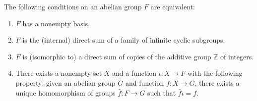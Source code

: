 The following conditions on an abelian group $F$ are equivalent:
\begin{enumerate}
\item[(i)] $F$ has a nonempty basis.
\item[(ii)] $F$ is the (internal) direct sum of a family of infinite cyclic subgroups.
\item[(iii)] $F$ is (isomorphic to) a direct sum of copies of the additive group $\mathbb{Z}$ of integers.
\item[(iv)] There exists a nonempty set $X$ and a function $\iota: X \to F$ with the following property: given an abelian group $G$ and function $f: X \to G$, there exists a unique homomorphism of groups $\bar{f}: F \to G$ such that $\bar{f}\iota = f$.
\end{enumerate}
